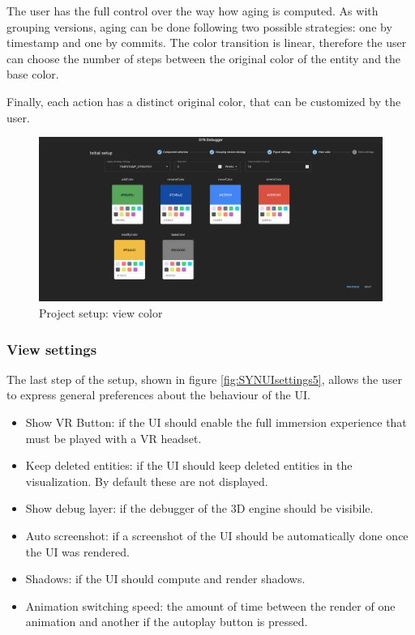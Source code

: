 The user has the full control over the way how aging is computed. 
As with grouping versions, aging can be done following two possible strategies: one by timestamp and one by commits. 
The color transition is linear, therefore the user can choose the number of steps between the original color of the entity and the base color. 

Finally, each action has a distinct original color, that can be customized by the user. 

\begin{figure}
    \center
    \includegraphics[width=\textwidth]{SYNUI-settings4.png}
    \caption{Project setup: view color}
    \label{fig:SYNUIsettings4}
\end{figure}

\subsubsection*{View settings}
The last step of the setup, shown in figure \ref{fig:SYNUIsettings5}, allows the user to express general preferences about the behaviour of the UI.

\begin{itemize}
    \item Show VR Button: if the UI should enable the full immersion experience that must be played with a VR headset. 
    \item Keep deleted entities: if the UI should keep deleted entities in the visualization. By default these are not displayed. 
    \item Show debug layer: if the debugger of the 3D engine should be visibile. 
    \item Auto screenshot: if a screenshot of the UI should be automatically done once the UI was rendered.
    \item Shadows: if the UI should compute and render shadows. 
    \item Animation switching speed: the amount of time between the render of one animation and another if the autoplay button is pressed. 
\end{itemize}

